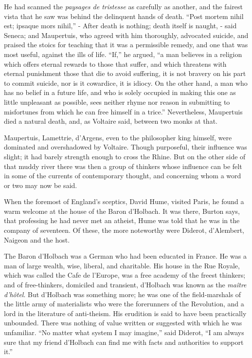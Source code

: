 \documentclass[]{book}
\begin{document}
He had scanned the \emph{paysages de tristesse} as carefully as another,
and the fairest vista that he saw was behind the delinquent hands of
death. ``Post mortem nihil est; ipsaque mors nihil,'' - After death is
nothing; death itself is naught, - said Seneca; and Maupertuis, who
agreed with him thoroughly, advocated suicide, and praised the stoics
for teaching that it was a permissible remedy, and one that was most
useful, against the ills of life. ``If,'' he argued, ``a man believes in
a religion which offers eternal rewards to those that suffer, and which
threatens with eternal punishment those that die to avoid suffering, it
is not bravery on his part to commit suicide, nor is it cowardice, it is
idiocy. On the other hand, a man who has no belief in a future life, and
who is solely occupied in making this one as little unpleasant as
possible, sees neither rhyme nor reason in submitting to misfortunes
from which he can free himself in a trice.'' Nevertheless, Maupertuis
died a natural death, and, as Voltaire said, between two monks at that.

Maupertuis, Lamettrie, d'Argens, even to the philosopher king himself,
were dominated and overshadowed by Voltaire. Though purposeful, their
influence was slight; it had barely strength enough to cross the Rhine.
But on the other side of that muddy river there was then a group of
thinkers whose influence can be felt in some of the currents of
contemporary thought, and concerning whom a word or two may now be said.

When the foremost of England's sceptics, David Hume, visited Paris, he
found a warm welcome at the house of the Baron d'Holbach. It was there,
Burton says, that professing he had never met an atheist, Hume was told
that he was in the company of seventeen. Of these, the more noteworthy
were Diderot, d'Alembert, Naigeon and the host.

The Baron d'Holbach was a German who had been educated in France. He was
a man of large wealth, wise, liberal, and charitable. His house in the
Rue Royale, which was called the Cafe de l'Europe, was a free academy of
the freest thinkers; and of free-thinkers, domiciled and transient,
d'Holbach was known as the \emph{maître d'hôtel}. But d'Holbach was
something more; he was one of the field-marshals of the little army of
materialists who were the forerunners of the Revolution, and a lord in
the literature of anti-theism. His erudition is said to have been
practically unbounded. There was nothing of value written or suggested
with which he was unfamiliar. ``No matter what system I may imagine,''
said Diderot, ``I am always sure that my friend d'Holbach can find me
with facts and authorities to support it.''
\end{document}
